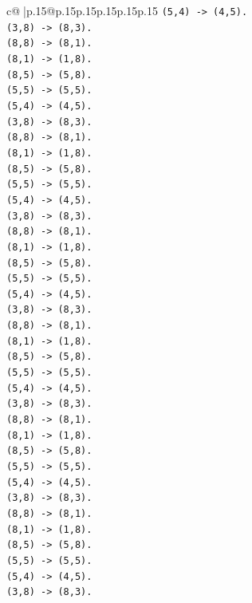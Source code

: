 \documentclass{article}
\begin{document}
{\begin{supertabular}{c@{$\;$}|p{.15\linewidth}@{}p{.15\linewidth}p{.15\linewidth}p{.15\linewidth}p{.15\linewidth}p{.15\linewidth}}
{{{\texttt{(5,4) {-}> (4,5).} \\
\texttt{(3,8) {-}> (8,3).} \\
\texttt{(8,8) {-}> (8,1).} \\
\texttt{(8,1) {-}> (1,8).} \\
\texttt{(8,5) {-}> (5,8).} \\
\texttt{(5,5) {-}> (5,5).} \\
\texttt{(5,4) {-}> (4,5).} \\
\texttt{(3,8) {-}> (8,3).} \\
\texttt{(8,8) {-}> (8,1).} \\
\texttt{(8,1) {-}> (1,8).} \\
\texttt{(8,5) {-}> (5,8).} \\
\texttt{(5,5) {-}> (5,5).} \\
\texttt{(5,4) {-}> (4,5).} \\
\texttt{(3,8) {-}> (8,3).} \\
\texttt{(8,8) {-}> (8,1).} \\
\texttt{(8,1) {-}> (1,8).} \\
\texttt{(8,5) {-}> (5,8).} \\
\texttt{(5,5) {-}> (5,5).} \\
\texttt{(5,4) {-}> (4,5).} \\
\texttt{(3,8) {-}> (8,3).} \\
\texttt{(8,8) {-}> (8,1).} \\
\texttt{(8,1) {-}> (1,8).} \\
\texttt{(8,5) {-}> (5,8).} \\
\texttt{(5,5) {-}> (5,5).} \\
\texttt{(5,4) {-}> (4,5).} \\
\texttt{(3,8) {-}> (8,3).} \\
\texttt{(8,8) {-}> (8,1).} \\
\texttt{(8,1) {-}> (1,8).} \\
\texttt{(8,5) {-}> (5,8).} \\
\texttt{(5,5) {-}> (5,5).} \\
\texttt{(5,4) {-}> (4,5).} \\
\texttt{(3,8) {-}> (8,3).} \\
\texttt{(8,8) {-}> (8,1).} \\
\texttt{(8,1) {-}> (1,8).} \\
\texttt{(8,5) {-}> (5,8).} \\
\texttt{(5,5) {-}> (5,5).} \\
\texttt{(5,4) {-}> (4,5).} \\
\texttt{(3,8) {-}> (8,3).} \\
}}}
\end{supertabular}}
\end{document}
